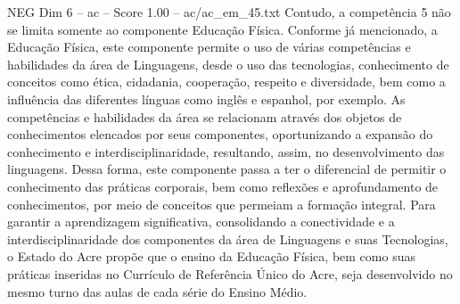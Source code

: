 \begin{textsample}{NEG Dim 6 – ac – Score 1.00 – ac/ac\_em\_45.txt}
Contudo, a competência 5 não se limita somente ao componente Educação Física.
Conforme já mencionado, a Educação Física, este componente permite o uso de várias competências e habilidades da área de Linguagens, desde o uso das tecnologias, conhecimento de conceitos como ética, cidadania, cooperação, respeito e diversidade, bem como a influência das diferentes línguas como inglês e espanhol, por exemplo.
As competências e habilidades da área se relacionam através dos objetos de conhecimentos elencados por seus componentes, oportunizando a expansão do conhecimento e interdisciplinaridade, resultando, assim, no desenvolvimento das linguagens.
Dessa forma, este componente passa a ter o diferencial de permitir o conhecimento das práticas corporais, bem como reflexões e aprofundamento de conhecimentos, por meio de conceitos que permeiam a formação integral.
Para garantir a aprendizagem significativa, consolidando a conectividade e a interdisciplinaridade dos componentes da área de Linguagens e suas Tecnologias, o Estado do Acre propõe que o ensino da Educação Física, bem como suas práticas inseridas no Currículo de Referência Único do Acre, seja desenvolvido no mesmo turno das aulas de cada série do Ensino Médio.

\end{textsample}
